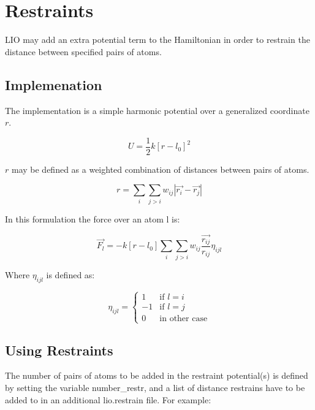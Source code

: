 \documentclass[journal=jctcce,manuscript=article]{achemso}
\begin{document}
\newpage
\section{Restraints}
LIO may add an extra potential term to the Hamiltonian in order to restrain the distance between specified pairs of atoms.

    \subsection{Implemenation}
    The implementation is a simple harmonic potential over a generalized coordinate $r$.

    \begin{equation}
      U=\frac{1}{2} k [r - l_0]^2  
      \label{E_restrain}
    \end{equation}

    $r$ may be defined as a weighted combination of distances between pairs of atoms.

    \begin{equation}
      r=  \sum_{i} \sum_{j>i} w_{ij} |\vec{r_i} - \vec{r_j}|
      \label{gen_coord}
    \end{equation}

    In this formulation the force over an atom l is:

    \begin{equation}
      \vec{F_l}= -k [r - l_0] \sum_{i} \sum_{j>i} w_{ij} \frac{\vec{r_{ij}}}{r_{ij}} \eta_{ijl}     
      \label{rest_force}
    \end{equation}

    Where $\eta_{ijl}$ is defined as:

    \begin{equation*}
      \eta_{ijl} =
       \begin{cases}
         1 & \text{if $l=i$}\\
         -1 & \text{if $l=j$}\\
         0 & \text{in other case}
       \end{cases}
       \label{eta}
    \end{equation*}


    \subsection{Using Restraints}

    The number of pairs of atoms to be added in the restraint potential(s) is defined by setting the variable number\_restr, and a list of distance restrains have to be added to in an additional lio.restrain file. For example:
\end{document}
